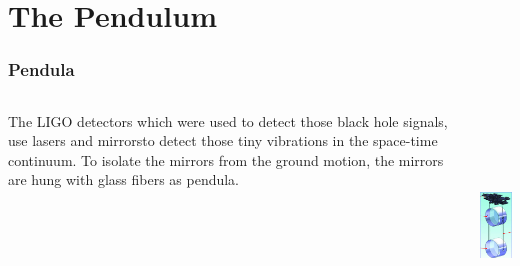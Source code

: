 \documentclass[pdf,hideothersubsections]{beamer}
\begin{document}


\section{The Pendulum}
\begin{frame}
\frametitle{Pendula}

\begin{columns}[T]
   \begin{column}{0.5\textwidth}
    The LIGO detectors which were used to detect those black hole signals, use lasers and mirrors\footnotemark to detect those tiny vibrations in the space-time continuum. To isolate the mirrors from the ground motion, the mirrors are hung with 
glass fibers as pendula\footnotemark.

   \end{column}

   \pause
   \begin{column}{0.5\textwidth}
   \includegraphics[height=6cm]{LIGO-Pendulum-diagram.png}      

   \end{column}
  
\end{columns}

\end{frame}
\end{document}
